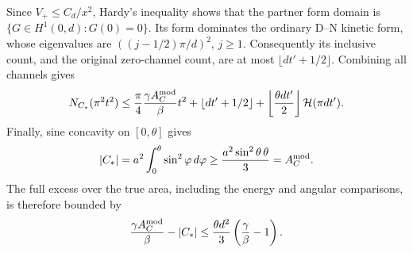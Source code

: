 \documentclass[11pt,reqno]{amsart}
\numberwithin{equation}{section}
\begin{document}
Since $V_+\le C_d/x^2$, Hardy's inequality shows that the partner form
domain is $\{G\in H^1(0,d):G(0)=0\}$.  Its form dominates the ordinary
D--N kinetic form, whose eigenvalues are $((j-1/2)\pi/d)^2$, $j\ge1$.
Consequently its inclusive count, and the original zero-channel count,
are at most $\lfloor dt'+1/2\rfloor$.  Combining all channels gives
\begin{equation}\label{geo:right-count}
 N_{C_*}(\pi^2t^2)\le\frac\pi4\frac{\gamma A_C^{\rm mod}}\beta t^2
      +\lfloor dt'+1/2\rfloor
      +\left\lfloor\frac{\theta dt'}2\right\rfloor
                                        \mathcal H(\pi dt').
\end{equation}
Finally, sine concavity on $[0,\theta]$ gives
\[
 |C_*|=a^2\int_0^\theta\sin^2\varphi\,d\varphi
       \ge\frac{a^2\sin^2\theta\,\theta}{3}
       =A_C^{\rm mod}.
\]
The full excess over the true area, including the energy and angular
comparisons, is therefore bounded by
\begin{equation}\label{geo:right-area-error}
 \frac{\gamma A_C^{\rm mod}}\beta-|C_*|
       \le\frac{\theta d^2}{3}\left(\frac\gamma\beta-1\right).
\end{equation}
\end{document}

